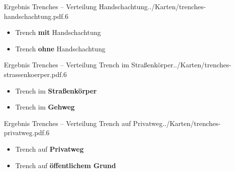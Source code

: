\documentclass[11pt, dvipsnames,aspectratio=169]{beamer}
\newcommand\colorrule[1]{\tikz{\draw[white,opacity=0] (0,0) -- (0,-.08);\draw[white,opacity=0] (0,0) -- (.58,0);\fill[#1] (0,0) rectangle (.51,.08);}}
\begin{document}
\begin{mapframe}{Ergebnis Trenches -- Verteilung Handschachtung}{../Karten/trenches-handschachtung.pdf}{.6\textwidth}
	\begin{itemize}
		\item[\colorrule{trenchgreen}] Trench \textbf{mit} Handschachtung
		\item[\colorrule{trenchblack}] Trench \textbf{ohne} Handschachtung
	\end{itemize}
\end{mapframe}

\begin{mapframe}{Ergebnis Trenches -- Verteilung Trench im Straßenkörper}{../Karten/trenches-strassenkoerper.pdf}{.6\textwidth}
	\begin{itemize}
		\item[\colorrule{trenchred}] Trench im \textbf{Straßenkörper}
		\item[\colorrule{trenchblack}] Trench im \textbf{Gehweg}
	\end{itemize}
\end{mapframe}

\begin{mapframe}{Ergebnis Trenches -- Verteilung Trench auf Privatweg}{../Karten/trenches-privatweg.pdf}{.6\textwidth}
	\begin{itemize}
		\item[\colorrule{trenchblue}] Trench auf \textbf{Privatweg}
		\item[\colorrule{trenchblack}] Trench auf \textbf{öffentlichem Grund}
	\end{itemize}
\end{mapframe}
\end{document}
